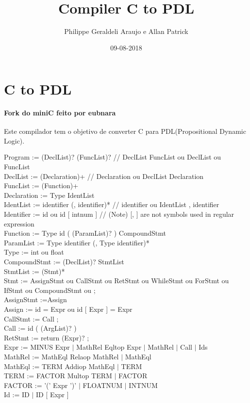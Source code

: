 \documentclass{article}
\title{Compiler C to PDL}
\date{09-08-2018}
\author{Philippe Geraldeli Araujo e Allan Patrick}
\begin{document}
\maketitle
{}
\newpage
{}

\section{C to PDL}

\paragraph{Fork do miniC feito por eubnara\\}
Este compilador tem o objetivo de converter C para PDL(Propositional Dynamic Logic). \vspace{10mm}

\hspace{-6.5mm} \small 
Program := (DeclList)? (FuncList)?   // DeclList FuncList ou DeclList ou FuncList  \\
DeclList := (Declaration)+          // Declaration ou DeclList Declaration \\
FuncList := (Function)+ \\ 
Declaration := Type IdentList \\
IdentList := identifier (, identifier)*  // identifier ou IdentList , identifier \\
Identifier := id ou id [ intnum ]      // (Note) [, ] are not symbols used in regular expression \\
Function := Type id ( (ParamList)? ) CompoundStmt \\
ParamList := Type identifier (, Type identifier)* \\
Type := int ou float \\
CompoundStmt := { (DeclList)? StmtList } \\
StmtList := (Stmt)* \\
Stmt := AssignStmt ou CallStmt ou RetStmt ou WhileStmt ou ForStmt ou IfStmt ou CompoundStmt ou ; \\
AssignStmt :=Assign  \\
Assign := id = Expr ou id [ Expr ] = Expr \\
CallStmt := Call ; \\
Call := id ( (ArgList)? ) \\
RetStmt := return (Expr)? ;  \\
Expr := MINUS Expr $|$ MathRel Eqltop Expr $|$ MathRel $|$ Call $|$ Ids \\
MathRel := MathEql Relaop MathRel $|$ MathEql \\
MathEql := TERM Addiop MathEql $|$ TERM \\
TERM := FACTOR Multop TERM $|$ FACTOR \\
FACTOR := '(' Expr ')' $|$ FLOATNUM $|$ INTNUM \\
Id := ID $|$ ID [ Expr ] \\
\end{document}
